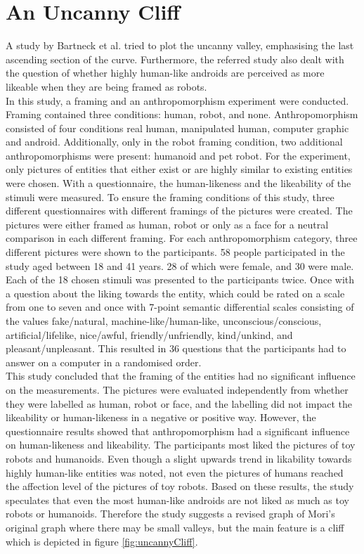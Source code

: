 \section{An Uncanny Cliff}
A study by Bartneck et al. \cite{uncanny_cliff} tried to plot the uncanny valley, emphasising the last ascending section of the curve. Furthermore, the referred study also dealt with the question of whether highly human-like androids are perceived as more likeable when they are being framed as robots.\\
In this study, a framing and an anthropomorphism experiment were conducted. Framing contained three conditions: human, robot, and none. Anthropomorphism consisted of four conditions real human, manipulated human, computer graphic and android. Additionally, only in the robot framing condition, two additional anthropomorphisms were present: humanoid and pet robot. For the experiment, only pictures of entities that either exist or are highly similar to existing entities were chosen. 
With a questionnaire, the human-likeness and the likeability of the stimuli were measured.
To ensure the framing conditions of this study, three different questionnaires with different framings of the pictures were created. The pictures were either framed as human, robot or only as a face for a neutral comparison in each different framing. For each anthropomorphism category, three different pictures were shown to the participants. 
58 people participated in the study aged between 18 and 41 years. 28 of which were female, and 30 were male.
Each of the 18 chosen stimuli was presented to the participants twice. Once with a question about the liking towards the entity, which could be rated on a scale from one to seven and once with 7-point semantic differential scales consisting of the values fake/natural, machine-like/human-like, unconscious/conscious, artificial/lifelike, nice/awful, friendly/unfriendly, kind/unkind, and pleasant/unpleasant. This resulted in 36 questions that the participants had to answer on a computer in a randomised order.\\
This study concluded that the framing of the entities had no significant influence on the measurements. The pictures were evaluated independently from whether they were labelled as human, robot or face, and the labelling did not impact the likeability or human-likeness in a negative or positive way.
 However, the questionnaire results showed that anthropomorphism had a significant influence on human-likeness and likeability. The participants most liked the pictures of toy robots and humanoids. Even though a slight upwards trend in likability towards highly human-like entities was noted, not even the pictures of humans reached the affection level of the pictures of toy robots. Based on these results, the study speculates that even the most human-like androids are not liked as much as toy robots or humanoids. Therefore the study suggests a revised graph of Mori's original graph where there may be small valleys, but the main feature is a cliff which is depicted in figure \ref{fig:uncannyCliff}.
